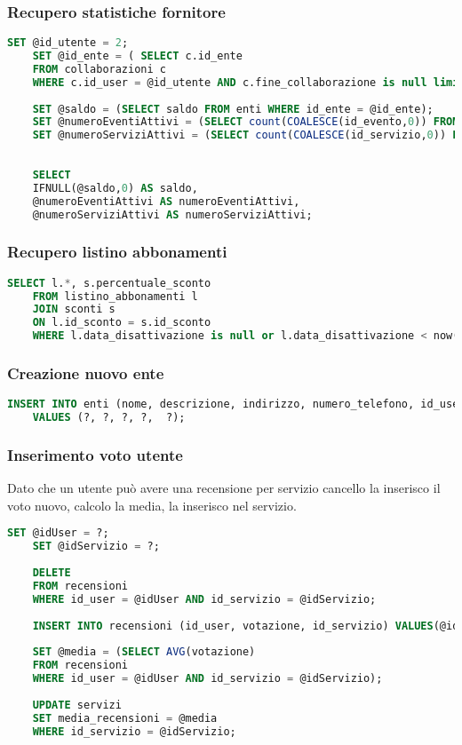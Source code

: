 \subsubsection{Recupero statistiche fornitore}
\begin{lstlisting}[language=SQL]
	SET @id_utente = 2;
	SET @id_ente = ( SELECT c.id_ente
	FROM collaborazioni c
	WHERE c.id_user = @id_utente AND c.fine_collaborazione is null limit 1);
	
	SET @saldo = (SELECT saldo FROM enti WHERE id_ente = @id_ente);
	SET @numeroEventiAttivi = (SELECT count(COALESCE(id_evento,0)) FROM eventi WHERE fine_validita > now() AND id_ente = @id_ente);
	SET @numeroServiziAttivi = (SELECT count(COALESCE(id_servizio,0)) FROM servizi WHERE fine_validita > now() AND id_ente = @id_ente);
	
	
	SELECT  
	IFNULL(@saldo,0) AS saldo,
	@numeroEventiAttivi AS numeroEventiAttivi,
	@numeroServiziAttivi AS numeroServiziAttivi;
\end{lstlisting}




\subsubsection{Recupero listino abbonamenti}
\begin{lstlisting}[language=SQL]
	SELECT l.*, s.percentuale_sconto
	FROM listino_abbonamenti l
	JOIN sconti s
	ON l.id_sconto = s.id_sconto
	WHERE l.data_disattivazione is null or l.data_disattivazione < now();
\end{lstlisting}


\subsubsection{Creazione nuovo ente}
\begin{lstlisting}[language=SQL]
	INSERT INTO enti (nome, descrizione, indirizzo, numero_telefono, id_user) 
	VALUES (?, ?, ?, ?,  ?);
\end{lstlisting}



\subsubsection{Inserimento voto utente}
Dato che un utente può avere una recensione per servizio cancello la inserisco il voto nuovo, calcolo la media, la inserisco nel servizio.
\begin{lstlisting}[language=SQL]
	SET @idUser = ?;
	SET @idServizio = ?;
	
	DELETE 
	FROM recensioni 
	WHERE id_user = @idUser AND id_servizio = @idServizio;
	
	INSERT INTO recensioni (id_user, votazione, id_servizio) VALUES(@idUser,?,@idServizio);
	
	SET @media = (SELECT AVG(votazione) 
	FROM recensioni 
	WHERE id_user = @idUser AND id_servizio = @idServizio);
	
	UPDATE servizi
	SET media_recensioni = @media
	WHERE id_servizio = @idServizio;
\end{lstlisting}




